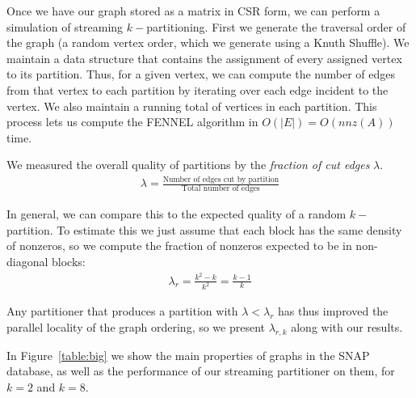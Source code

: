 \documentclass[11pt]{article}
\begin{document}
Once we have our graph stored as a matrix in CSR form, we can perform a simulation of streaming $k-$partitioning. First we generate the traversal order of the graph (a random vertex order, which we generate using a Knuth Shuffle). We maintain a data structure that contains the assignment of every assigned vertex to its partition. Thus, for a given vertex, we can compute the number of edges from that vertex to each partition by iterating over each edge incident to the vertex. We also maintain a running total of vertices in each partition. This process lets us compute the FENNEL algorithm in $O(|E|)=O(nnz(A))$ time. 

We measured the overall quality of partitions by the \textit{fraction of cut edges} $\lambda$.
\begin{align}\lambda = \frac{\text{Number of edges cut by partition}}{\text{Total number of edges}}\end{align}

In general, we can compare this to the expected quality of a random $k-$partition. To estimate this we just assume that each block has the same density of nonzeros, so we compute the fraction of nonzeros expected to be in non-diagonal blocks:
\begin{align}\lambda_r = \frac{k^2 - k}{k^2} = \frac{k-1}{k} \end{align}

Any partitioner that produces a partition with $\lambda < \lambda_r$ has thus improved the parallel locality of the graph ordering, so we present $\lambda_{r,k}$ along with our results.

In Figure~\ref{table:big} we show the main properties of graphs in the SNAP database, as well as the performance of our streaming partitioner on them, for $k=2$ and $k=8$. 
\end{document}
